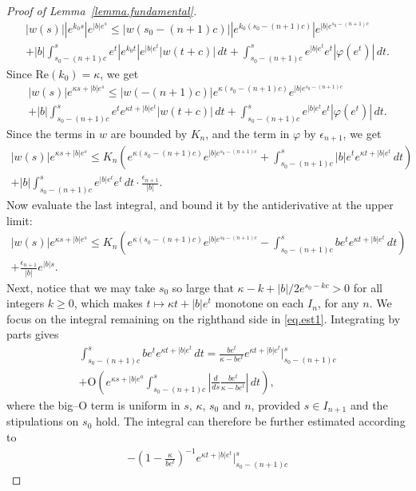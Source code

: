 \documentclass[a4paper,10pt,reqno]{amsart}
\numberwithin{equation}{section}
\theoremstyle{definition}
\theoremstyle{remark}
\DeclareMathOperator{\1}{\mathbbm 1}
\begin{document}
\begin{proof}[Proof of Lemma~\ref{lemma.fundamental}]
\begin{multline*}
	|w(s)||e^{k_0 s}| e^{|b|e^s} 
	\leq |w(s_0-(n+1)c)||e^{k_0(s_0-(n+1)c)}| e^{|b|e^{s_0-(n+1)c}}
	\\+|b|\int_{s_0-(n+1)c}^s e^t |e^{k_0t}|e^{|b|e^t}|w(t+c)|\,dt
	+\int_{s_0-(n+1)c}^s e^{|b|e^t}e^t|\varphi(e^t)|\,dt.	
\end{multline*}
Since $\text{Re}(k_0)=\kappa$, we get 
\begin{multline*}
	|w(s)| e^{\kappa s+|b|e^s} 
	\leq |w(-(n+1)c)|e^{\kappa(s_0-(n+1)c)} e^{|b|e^{s_0-(n+1)c}}
	\\+|b|\int_{s_0-(n+1)c}^s e^t e^{\kappa t+|b|e^t}|w(t+c)|\,dt
	+\int_{s_0-(n+1)c}^s e^{|b|e^t}e^t|\varphi(e^t)|\,dt.	
\end{multline*}
Since the terms in $w$ are bounded by $K_n$, and the term in $\varphi$ by $\epsilon_{n+1}$, we get 
\begin{multline*}
	|w(s)| e^{\kappa s+|b|e^s} 
	\leq K_n \left(e^{\kappa(s_0-(n+1)c)} e^{|b|e^{s_0-(n+1)c}}
	+\int_{s_0-(n+1)c}^s |b|e^t e^{\kappa t+|b|e^t}\,dt\right)
	\\+|b|\int_{s_0-(n+1)c}^s e^{|b|e^t}e^t\,dt \cdot \frac{\epsilon_{n+1}}{|b|}.	
\end{multline*}
Now evaluate the last integral, and bound it by the antiderivative at the upper limit: 
\begin{multline} \label{eq.est1}
	|w(s)| e^{\kappa s+|b|e^s} 
	\leq K_n \left(e^{\kappa(s_0-(n+1)c)} e^{|b|e^{s_0-(n+1)c}}
	-\int_{s_0-(n+1)c}^s be^t e^{\kappa t+|b|e^t}\,dt\right)
	\\+\frac{\epsilon_{n+1}}{|b|} e^{|b|s}.	
\end{multline}
Next, notice that we may take $s_0$ so large that $\kappa-k+|b|/2 e^{s_0-kc}>0$ for all integers $k\geq 0$, which makes $t\mapsto \kappa t+|b|e^t$ monotone on each $I_n$, for any $n$. We focus on the integral remaining on the righthand side in \eqref{eq.est1}. Integrating by parts gives
\begin{multline*}
	\int_{s_0-(n+1)c}^s b e^t e^{\kappa t+|b|e^t}\,dt
	=\frac{be^t}{\kappa-be^t} e^{\kappa t+|b|e^t}\Big|_{s_0-(n+1)c}^s
	\\+\text{O}\left(e^{\kappa s+|b|e^a}\int_{s_0-(n+1)c}^s \left|\frac{d}{ds} \frac{be^t}{\kappa-be^t}\right|\,dt\right),
\end{multline*}
where the big--O term is uniform in $s$, $\kappa$, $s_0$ and $n$, provided $s\in I_{n+1}$ and the stipulations on $s_0$ hold. The integral can therefore be further estimated according to 
\begin{multline*}
	-\left(1-\frac{\kappa}{be^t}\right)^{-1} e^{\kappa t+|b|e^t}\Big|_{s_0-(n+1)c}^s

\end{multline*}
\end{proof}
\end{document}
